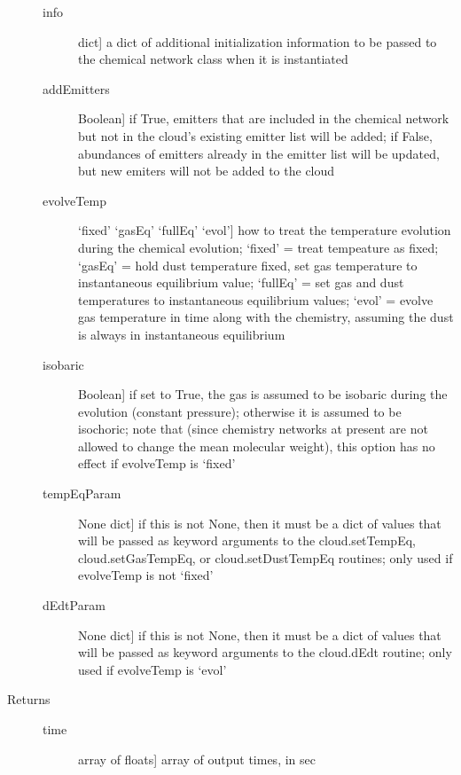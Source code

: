 \documentclass[letterpaper,10pt,english]{sphinxmanual}
\begin{document}
\begin{fulllineitems}
\begin{fulllineitems}
\begin{description}
\begin{description}
\item[{info}] \leavevmode{[}dict{]}
a dict of additional initialization information to be passed
to the chemical network class when it is instantiated

\item[{addEmitters}] \leavevmode{[}Boolean{]}
if True, emitters that are included in the chemical
network but not in the cloud's existing emitter list will
be added; if False, abundances of emitters already in the
emitter list will be updated, but new emiters will not be
added to the cloud

\item[{evolveTemp}] \leavevmode{[}`fixed' \textbar{} `gasEq' \textbar{} `fullEq' \textbar{} `evol'{]}
how to treat the temperature evolution during the
chemical evolution; `fixed' = treat tempeature as fixed;
`gasEq' = hold dust temperature fixed, set gas temperature
to instantaneous equilibrium value; `fullEq' = set gas and
dust temperatures to instantaneous equilibrium values;
`evol' = evolve gas temperature in time along with the
chemistry, assuming the dust is always in instantaneous
equilibrium

\item[{isobaric}] \leavevmode{[}Boolean{]}
if set to True, the gas is assumed to be isobaric during
the evolution (constant pressure); otherwise it is assumed
to be isochoric; note that (since chemistry networks at
present are not allowed to change the mean molecular
weight), this option has no effect if evolveTemp is `fixed'

\item[{tempEqParam}] \leavevmode{[}None \textbar{} dict{]}
if this is not None, then it must be a dict of values that
will be passed as keyword arguments to the cloud.setTempEq,
cloud.setGasTempEq, or cloud.setDustTempEq routines; only
used if evolveTemp is not `fixed'

\item[{dEdtParam}] \leavevmode{[}None \textbar{} dict{]}
if this is not None, then it must be a dict of values that
will be passed as keyword arguments to the cloud.dEdt
routine; only used if evolveTemp is `evol'

\end{description}

\item[{Returns}] \leavevmode\begin{description}
\item[{time}] \leavevmode{[}array of floats{]}
array of output times, in sec


\end{description}
\end{description}
\end{fulllineitems}
\end{fulllineitems}
\end{document}
